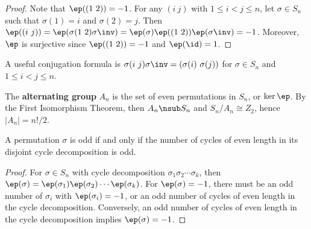  \label{prop3.24}
\begin{proof}
    Note that $\ep((1\ 2)) = -1$. For any $(i\ j)$ with $1 \leq i < j \leq n$, let $\sigma \in S_n$ such that $\sigma(1) = i$ and $\sigma(2) = j$. Then $\ep((i\ j)) = \ep(\sigma(1\ 2)\sigma\inv) = \ep(\sigma)\ep((1\ 2))\ep(\sigma\inv) = -1$. Moreover, $\ep$ is surjective since $\ep((1\ 2)) = -1$ and $\ep(\id) = 1$.
\end{proof}

\note A useful conjugation formula is $\sigma(i\ j)\sigma\inv = (\sigma(i)\ \sigma(j))$ for $\sigma \in S_n$ and $1 \leq i < j \leq n$.

 The \textbf{alternating group} $A_n$ is the set of even permutations in $S_n$, or $\ker\ep$. By the First Isomorphism Theorem, then $A_n \nsub S_n$ and $S_n/A_n \cong Z_2$, hence $|A_n| = n!/2$.

 \label{prop3.25}
A permutation $\sigma$ is odd if and only if the number of cycles of even length in its disjoint cycle decomposition is odd.
\begin{proof}
    For $\sigma \in S_n$ with cycle decomposition $\sigma_1\sigma_2 \cdots \sigma_k$, then $\ep(\sigma) = \ep(\sigma_1)\ep(\sigma_2) \cdots \ep(\sigma_k)$. For $\ep(\sigma) = -1$, there must be an odd number of $\sigma_i$ with $\ep(\sigma_i) = -1$, or an odd number of cycles of even length in the cycle decomposition. Conversely, an odd number of cycles of even length in the cycle decomposition implies $\ep(\sigma) = -1$.
\end{proof}

